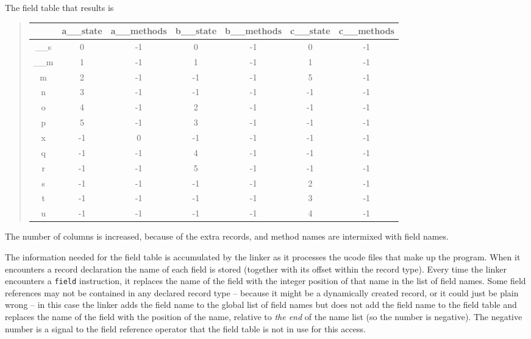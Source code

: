 The field table that results is
{\small
\begin{quote}
 \begin{tabular}{|c|c|c|c|c|c|c|}
   \hline
& a\_\_state & a\_\_methods & b\_\_state & b\_\_methods & c\_\_state & c\_\_methods\\
\hline
\_\_s &  0 & -1 &  0 & -1 &  0 & -1 \\ \hline
\_\_m &  1 & -1 &  1 & -1 &  1 & -1 \\ \hline
    m &  2 & -1 & -1 & -1 &  5 & -1 \\ \hline
    n &  3 & -1 & -1 & -1 & -1 & -1 \\ \hline
    o &  4 & -1 &  2 & -1 & -1 & -1 \\ \hline
    p &  5 & -1 &  3 & -1 & -1 & -1 \\ \hline
    x & -1 &  0 & -1 & -1 & -1 & -1 \\ \hline
    q & -1 & -1 &  4 & -1 & -1 & -1 \\ \hline
    r & -1 & -1 &  5 & -1 & -1 & -1 \\ \hline
    s & -1 & -1 & -1 & -1 &  2 & -1 \\ \hline
    t & -1 & -1 & -1 & -1 &  3 & -1 \\ \hline
    u & -1 & -1 & -1 & -1 &  4 & -1 \\ \hline
\end{tabular}   
\end{quote}
}
The number of columns is increased, because of the extra records, and method
names are intermixed with field names.

The information needed for the field table is accumulated by the linker as
it processes the ucode files that make up the program. When it encounters a
record declaration the name of each field is stored (together with its
offset within the record type). Every time the linker encounters a
\texttt{field} instruction, it replaces the name of the field with the
integer position of that name in the list of field names. Some field
references may not be contained in any declared record type -- because it
might be a dynamically created record, or it could just be plain wrong -- in
this case the linker adds the field name to the global list of field names
but does not add the field name to the field table and replaces the name of
the field with the position of the name, relative to {\em the end} of the
name list (so the number is negative). The negative number is a signal to
the field reference operator that the field table is not in use for this
access.

